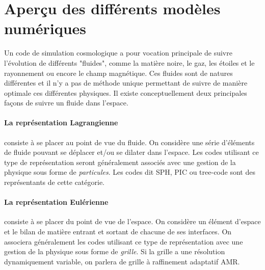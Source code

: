 
\section{Aperçu des différents modèles numériques}
\label{sec:gridpart}
Un code de simulation cosmologique a pour vocation principale de suivre l'évolution de différents "fluides", comme la matière noire, le gaz, les étoiles et le rayonnement ou encore le champ magnétique.
Ces fluides sont de natures différentes et il n'y a pas de méthode unique permettant de suivre de manière optimale ces différentes physiques.
Il existe conceptuellement deux principales façons de suivre un fluide dans l'espace.

\paragraph{La représentation Lagrangienne} consiste à se placer au point de vue du fluide.
On considère une série d'éléments de fluide pouvant se déplacer et/ou se dilater dans l'espace.
Les codes utilisant ce type de représentation seront généralement associés avec une gestion de la physique sous forme de \emph{particules}.
Les codes dit \ac{SPH}, \ac{PIC} ou tree-code sont des représentants de cette catégorie.


\paragraph{La représentation Eulérienne} consiste à se placer du point de vue de l'espace.
On considère un élément d'espace et le bilan de matière entrant et sortant de chacune de ses interfaces.
On associera généralement les codes utilisant ce type de représentation avec une gestion de la physique sous forme de \emph{grille}.
Si la grille a une résolution dynamiquement variable, on parlera de grille à raffinement adaptatif \ac{AMR}.

